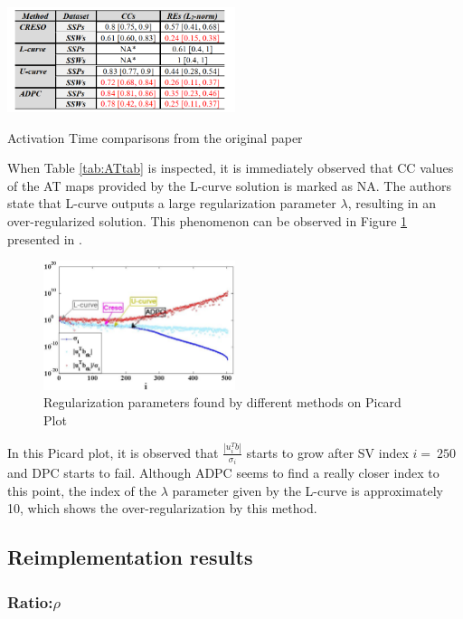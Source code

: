 \documentclass[draftcls, onecolumn, journal]{IEEEtran}
\begin{document}
\begin{table}[h]
    \centering
    \includegraphics[width=0.5\textwidth, height = 0.2\textwidth]{../images/ATTable.png}
    \caption{\label{tab:ATtab}Activation Time comparisons from the original paper}
\end{table}

When Table \ref{tab:ATtab} is inspected, it is immediately observed that CC values of the AT maps provided by the L-curve solution is marked as NA. The authors state that L-curve outputs a large regularization parameter $\lambda$, resulting in an over-regularized solution. This phenomenon can be observed in Figure \ref{fig:versus} presented in \cite*{chamorro2017improving}.

\begin{figure}[h]
\centering
\includegraphics[width=0.5\textwidth]{../images/Versus.png}
\caption{Regularization parameters found by different methods on Picard Plot}\label{fig:versus}
\end{figure}

In this Picard plot, it is observed that $\frac{|u_i^Tb|}{\sigma_i}$ starts to grow after SV index $i=~250$ and DPC starts to fail. Although ADPC seems to find a really closer index to this point, the index of the $\lambda$ parameter given by the L-curve is approximately 10, which shows the over-regularization by this method. 

\subsection{Reimplementation results}

\subsubsection*{Ratio:$\rho$}

\newpage
\printbibliography
\end{document}
